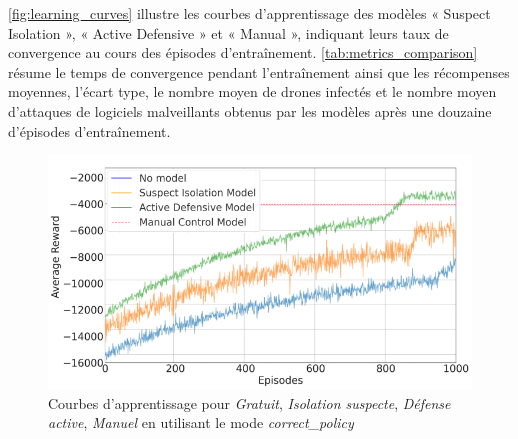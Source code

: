 \autoref{fig:learning_curves} illustre les courbes d'apprentissage des modèles « Suspect Isolation », « Active Defensive » et « Manual », indiquant leurs taux de convergence au cours des épisodes d'entraînement.
\autoref{tab:metrics_comparison} résume le temps de convergence pendant l'entraînement ainsi que les récompenses moyennes, l'écart type, le nombre moyen de drones infectés et le nombre moyen d'attaques de logiciels malveillants obtenus par les modèles après une douzaine d'épisodes d'entraînement.

\begin{figure}[ht]
    \centering
    \includegraphics[width=1\linewidth]{figures/learning_curves.png}
    \caption{Courbes d'apprentissage pour \textit{Gratuit}, \textit{Isolation suspecte}, \textit{Défense active}, \textit{Manuel} en utilisant le mode \textit{correct\_policy} }
    \label{fig:learning_curves}
\end{figure}

